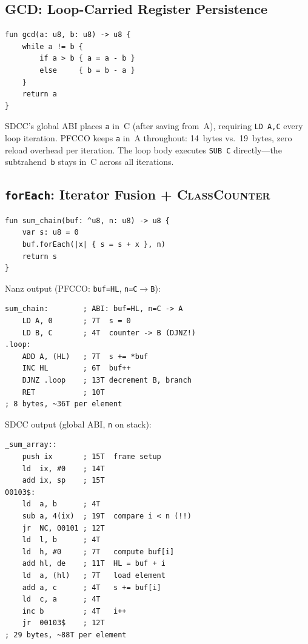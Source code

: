 \documentclass[sigplan,screen,nonacm]{acmart}
\begin{document}
\subsection{GCD: Loop-Carried Register Persistence}

\begin{lstlisting}[language=nanz,caption={GCD in Nanz.}]
fun gcd(a: u8, b: u8) -> u8 {
    while a != b {
        if a > b { a = a - b }
        else     { b = b - a }
    }
    return a
}
\end{lstlisting}

SDCC's global ABI places \texttt{a} in~C (after saving from~A), requiring
\texttt{LD~A,C} every loop iteration.  PFCCO keeps \texttt{a} in~A
throughout: 14~bytes vs.\ 19~bytes, zero reload overhead per iteration.
The loop body executes \texttt{SUB~C} directly---the subtrahend~\texttt{b}
stays in~C across all iterations.

\subsection{\texttt{forEach}: Iterator Fusion + \textsc{ClassCounter}}

\begin{lstlisting}[language=nanz,caption={Lambda iterator chain.}]
fun sum_chain(buf: ^u8, n: u8) -> u8 {
    var s: u8 = 0
    buf.forEach(|x| { s = s + x }, n)
    return s
}
\end{lstlisting}

\noindent Nanz output (PFCCO: \texttt{buf=HL}, \texttt{n=C$\to$B}):
\begin{lstlisting}[language=z80asm]
sum_chain:        ; ABI: buf=HL, n=C -> A
    LD A, 0       ; 7T  s = 0
    LD B, C       ; 4T  counter -> B (DJNZ!)
.loop:
    ADD A, (HL)   ; 7T  s += *buf
    INC HL        ; 6T  buf++
    DJNZ .loop    ; 13T decrement B, branch
    RET           ; 10T
; 8 bytes, ~36T per element
\end{lstlisting}

\noindent SDCC output (global ABI, \texttt{n} on stack):
\begin{lstlisting}[language=z80asm]
_sum_array::
    push ix       ; 15T  frame setup
    ld  ix, #0    ; 14T
    add ix, sp    ; 15T
00103$:
    ld  a, b      ; 4T
    sub a, 4(ix)  ; 19T  compare i < n (!!)
    jr  NC, 00101 ; 12T
    ld  l, b      ; 4T
    ld  h, #0     ; 7T   compute buf[i]
    add hl, de    ; 11T  HL = buf + i
    ld  a, (hl)   ; 7T   load element
    add a, c      ; 4T   s += buf[i]
    ld  c, a      ; 4T
    inc b         ; 4T   i++
    jr  00103$    ; 12T
; 29 bytes, ~88T per element
\end{lstlisting}
\end{document}
